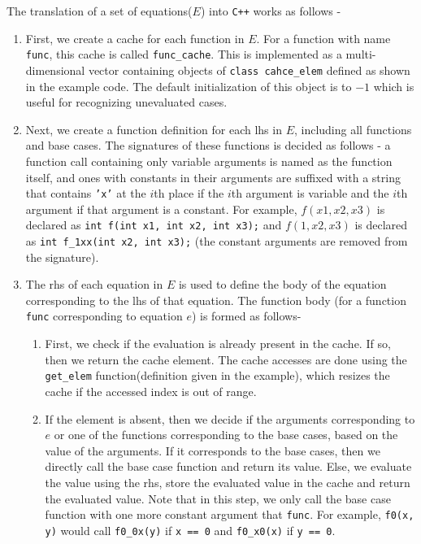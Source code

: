 \documentclass[12pt]{report}
\begin{document}
    The translation of a set of equations($E$) into \texttt{C++} works as follows - 
    \begin{enumerate}
        \item First, we create a cache for each function in $E$. For a function with name \texttt{func}, this cache is called \texttt{func\_cache}. This is implemented as a multi-dimensional vector containing objects of \texttt{class cahce\_elem} defined as shown in the example code. The default initialization of this object is to $-1$ which is useful for recognizing unevaluated cases.
        \item Next, we create a function definition for each lhs in $E$, including all functions and base cases. The signatures of these functions is decided as follows - a function call containing only variable arguments is named as the function itself, and ones with constants in their arguments are suffixed with a string that contains \texttt{'x'} at the $i$th place if the $i$th argument is variable and the $i$th argument if that argument is a constant. For example, $f(x1, x2, x3)$ is declared as \texttt{int f(int x1, int x2, int x3);} and $f(1, x2, x3)$ is declared as \texttt{int f\_1xx(int x2, int x3);} (the constant arguments are removed from the signature).
        \item The rhs of each equation in $E$ is used to define the body of the equation corresponding to the lhs of that equation. The function body (for a function \texttt{func} corresponding to equation $e$) is formed as follows-
        \begin{enumerate}
            \item First, we check if the evaluation is already present in the cache. If so, then we return the cache element. The cache accesses are done using the \texttt{get\_elem} function(definition given in the example), which resizes the cache if the accessed index is out of range. 
            \item If the element is absent, then we decide if the arguments corresponding to $e$ or one of the functions corresponding to the base cases, based on the value of the arguments. If it corresponds to the base cases, then we directly call the base case function and return its value. Else, we evaluate the value using the rhs, store the evaluated value in the cache and return the evaluated value. Note that in this step, we only call the base case function with one more constant argument that \texttt{func}. For example, \texttt{f0(x, y)} would call \texttt{f0\_0x(y)} if \texttt{x == 0} and \texttt{f0\_x0(x)} if \texttt{y == 0}.

\end{enumerate}
\end{enumerate}
\end{document}
